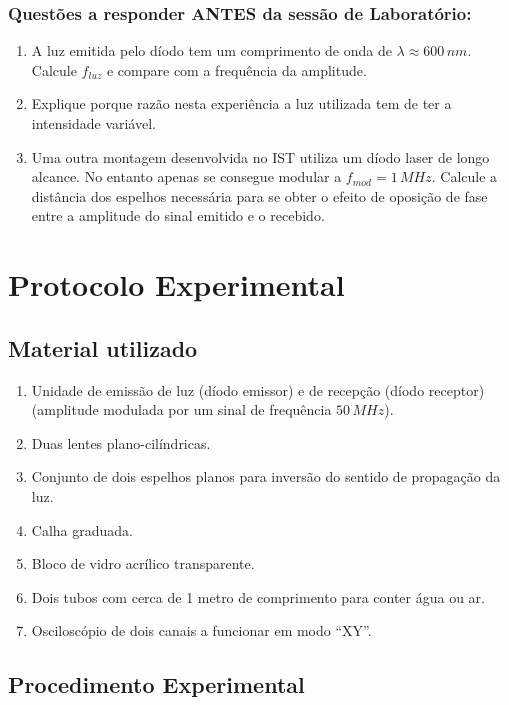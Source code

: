 \documentclass[a4paper,12pt]{article}      %
\begin{document}
\subsubsection{\sf Questões a responder ANTES da sessão de Laboratório:}
\begin{enumerate}
\item A luz emitida pelo díodo tem um comprimento de onda de $\lambda \approx 600 \, nm$. Calcule $f_{luz}$ e compare com a frequência da amplitude.
\item Explique porque razão nesta experiência a luz utilizada  tem de ter a intensidade variável.
\item Uma outra montagem desenvolvida no IST utiliza um díodo laser de longo alcance. No entanto apenas se consegue modular a $f_{mod}=1\, MHz$. Calcule a distância
dos espelhos necessária para se obter o efeito de oposição de fase entre a amplitude do sinal emitido e o recebido.
\end{enumerate}

\newpage
\section{\sf Protocolo Experimental}
\subsection{\sf Material utilizado}

\begin{enumerate}
\setlength{\itemsep}{0mm}
\item Unidade de emissão de luz (díodo emissor) e de recepção (díodo receptor)
(amplitude modulada por um sinal de frequência $50\,MHz$).
\item Duas lentes plano-cilíndricas.
\item Conjunto de dois espelhos planos para inversão do sentido de propagação da luz.
\item Calha graduada.  
\item Bloco de vidro acrílico transparente.
\item Dois tubos com cerca de 1 metro de comprimento para conter água ou ar. 
\item Osciloscópio de dois canais a funcionar em modo “XY”.
\end{enumerate}

\subsection{\sf Procedimento Experimental}
\end{document}
